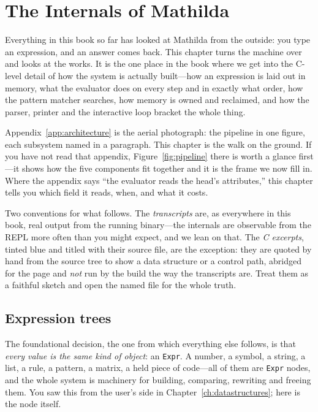 \chapter{The Internals of Mathilda}
\label{ch:internals}

Everything in this book so far has looked at Mathilda from the outside: you type an
expression, and an answer comes back. This chapter turns the machine over and looks
at the works. It is the one place in the book where we get into the C-level detail
of how the system is actually built---how an expression is laid out in memory, what
the evaluator does on every step and in exactly what order, how the pattern matcher
searches, how memory is owned and reclaimed, and how the parser, printer and the
interactive loop bracket the whole thing.

Appendix~\ref{app:architecture} is the aerial photograph: the pipeline in one
figure, each subsystem named in a paragraph. This chapter is the walk on the
ground. If you have not read that appendix, Figure~\ref{fig:pipeline} there is worth
a glance first---it shows how the five components fit together and it is the frame we
now fill in. Where the appendix says ``the evaluator reads the head's attributes,''
this chapter tells you which field it reads, when, and what it costs.

Two conventions for what follows. The \emph{transcripts} are, as everywhere in this
book, real output from the running binary---the internals are observable from the
REPL more often than you might expect, and we lean on that. The \emph{C excerpts},
tinted blue and titled with their source file, are the exception: they are quoted by
hand from the source tree to show a data structure or a control path, abridged for
the page and \emph{not} run by the build the way the transcripts are. Treat them as a
faithful sketch and open the named file for the whole truth.

\section{Expression trees}
\label{sec:int-expr}

The foundational decision, the one from which everything else follows, is that
\emph{every value is the same kind of object}: an \texttt{Expr}. A number, a symbol,
a string, a list, a rule, a pattern, a matrix, a held piece of code---all of them are
\texttt{Expr} nodes, and the whole system is machinery for building, comparing,
rewriting and freeing them. You saw this from the user's side in
Chapter~\ref{ch:datastructures}; here is the node itself.

